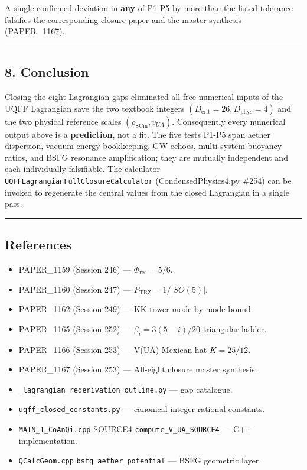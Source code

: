 \documentclass[
]{article}
\providecommand{\tightlist}{%
  \setlength{\itemsep}{0pt}\setlength{\parskip}{0pt}}
\begin{document}
A single confirmed deviation in \textbf{any} of P1-P5 by more than the
listed tolerance falsifies the corresponding closure paper and the
master synthesis (PAPER\_1167).

\begin{center}\rule{0.5\linewidth}{0.5pt}\end{center}

\subsection{8. Conclusion}\label{conclusion}

Closing the eight Lagrangian gaps eliminated all free numerical inputs
of the UQFF Lagrangian save the two textbook integers
\((D_{\mathrm{crit}}=26, D_{\mathrm{phys}}=4)\) and the two physical
reference scales \((\rho_{\mathrm{SCm}}, v_{UA})\). Consequently every
numerical output above is a \textbf{prediction}, not a fit. The five
tests P1-P5 span aether dispersion, vacuum-energy bookkeeping, GW
echoes, multi-system buoyancy ratios, and BSFG resonance amplification;
they are mutually independent and each individually falsifiable. The
calculator \texttt{UQFFLagrangianFullClosureCalculator}
(CondensedPhysics4.py \#254) can be invoked to regenerate the central
values from the closed Lagrangian in a single pass.

\begin{center}\rule{0.5\linewidth}{0.5pt}\end{center}

\subsection{References}\label{references}

\begin{itemize}
\tightlist
\item
  PAPER\_1159 (Session 246) --- \(\Phi_{\text{res}} = 5/6\).
\item
  PAPER\_1160 (Session 247) --- \(F_{\text{TRZ}} = 1/|SO(5)|\).
\item
  PAPER\_1162 (Session 249) --- KK tower mode-by-mode bound.
\item
  PAPER\_1165 (Session 252) --- \(\beta_{i} = 3(5-i)/20\) triangular
  ladder.
\item
  PAPER\_1166 (Session 253) --- V(UA) Mexican-hat \(K = 25/12\).
\item
  PAPER\_1167 (Session 253) --- All-eight closure master synthesis.
\item
  \texttt{\_lagrangian\_rederivation\_outline.py} --- gap catalogue.
\item
  \texttt{uqff\_closed\_constants.py} --- canonical integer-rational
  constants.
\item
  \texttt{MAIN\_1\_CoAnQi.cpp} SOURCE4 \texttt{compute\_V\_UA\_SOURCE4}
  --- C++ implementation.
\item
  \texttt{QCalcGeom.cpp} \texttt{bsfg\_aether\_potential} --- BSFG
  geometric layer.
\end{itemize}
\end{document}
